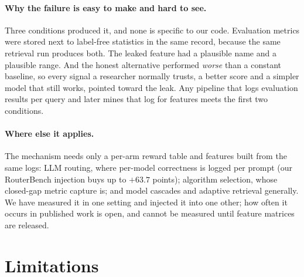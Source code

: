 \documentclass{article}
\begin{document}
\paragraph{Why the failure is easy to make and hard to see.} Three conditions produced it, and
none is specific to our code. Evaluation metrics were stored next to label-free statistics in the
same record, because the same retrieval run produces both. The leaked feature had a plausible name
and a plausible range. And the honest alternative performed \emph{worse} than a constant baseline,
so every signal a researcher normally trusts, a better score and a simpler model that still
works, pointed toward the leak. Any pipeline that logs evaluation results per query and later
mines that log for features meets the first two conditions.

\paragraph{Where else it applies.} The mechanism needs only a per-arm reward table and features
built from the same logs: LLM routing, where per-model correctness is logged per prompt (our
RouterBench injection buys up to $+63.7$ points); algorithm selection, whose closed-gap metric
capture is; and model cascades and adaptive retrieval generally. We have measured it in one
setting and injected it into one other; how often it occurs in published work is open, and
cannot be measured until feature matrices are released.

\section{Limitations}
\label{sec:limitations}
\end{document}
